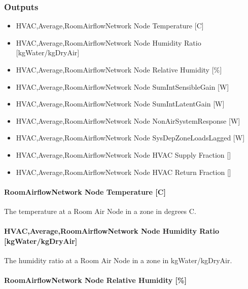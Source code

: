 \subsubsection{Outputs}\label{outputs-7-009}

\begin{itemize}
\item
  HVAC,Average,RoomAirflowNetwork Node Temperature {[}C{]}
\item
  HVAC,Average,RoomAirflowNetwork Node Humidity Ratio {[}kgWater/kgDryAir{]}
\item
  HVAC,Average,RoomAirflowNetwork Node Relative Humidity {[}\%{]}
\item
  HVAC,Average,RoomAirflowNetwork Node SumIntSensibleGain {[}W{]}
\item
  HVAC,Average,RoomAirflowNetwork Node SumIntLatentGain {[}W{]}
\item
  HVAC,Average,RoomAirflowNetwork Node NonAirSystemResponse {[}W{]}
\item
  HVAC,Average,RoomAirflowNetwork Node SysDepZoneLoadsLagged {[}W{]}
\item
  HVAC,Average,RoomAirflowNetwork Node HVAC Supply Fraction {[]}
\item
  HVAC,Average,RoomAirflowNetwork Node HVAC Return Fraction {[]}
\end{itemize}

\paragraph{RoomAirflowNetwork Node Temperature {[}C{]}}\label{roomairflownetwork-node-temperature-c-000}

The temperature at a Room Air Node in a zone in degrees C.

\paragraph{HVAC,Average,RoomAirflowNetwork Node Humidity Ratio {[}kgWater/kgDryAir{]}}\label{hvacaverageroomairflownetwork-node-humidity-ratio-kgwaterkgdryair}

The humidity ratio at a Room Air Node in a zone in kgWater/kgDryAir.

\paragraph{RoomAirflowNetwork Node Relative Humidity {[}\%{]}}\label{roomairflownetwork-node-relative-humidity}

